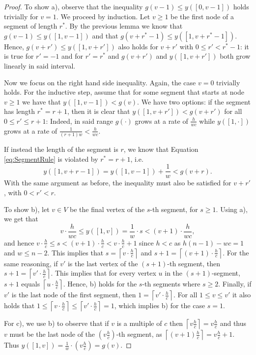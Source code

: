 \documentclass[11pt]{article}
\newcommand\+{\mkern2mu}
\newcommand{\ceil}[1]{\left\lceil #1 \right\rceil}
\begin{document}
\begin{proof}
     To show a), observe that the inequality $g(v-1) \leq y([0, v-1])$ holds trivially for $v=1$. We proceed by induction. Let $v \geq 1$ be the first node of a segment of length $r^*$. By the previous lemma we know that $g(v-1)\le y([1,v-1])$ and that $g(v+r^*-1)\le y([1,v+r^*-1])$. Hence,  $g(v+r') \leq y([1, v+r'])$ also holds for $v+r'$ with $0 \le r' < r^*-1$: it is true for $r'=-1$ and for $r'=r^*$ and $g(v+r')$ and $y([1, v+r'])$ both grow linearly in said interval. 
    
    Now we focus on the right hand side inequality. Again, the case $v=0$ trivially holds. For the inductive step, assume that for some segment that starts at node $v \geq 1$ we have that $y([1, v-1]) < g(v)$. We have two options: if the segment has length $r^*=r+1$, then it is clear that $y([1, v+r']) < g(v + r')$ for all $0\le r' \leq r+1$: Indeed, in said range $g(\cdot)$ grows at a rate of $\frac{h}{wc}$ while $y([1,\cdot])$ grows at a rate of $\frac{1}{(r+1)w} < \frac{h}{wc}$. 
    
    If instead the length of the segment is $r$, we know that Equation \eqref{eq:SegmentRule} is violated by $r^*=r+1$, i.e. 
    $$
        y([1, v+r-1]) = y([1, v-1]) + \frac{1}{w} < g(v+r).
    $$
    With the same argument as before, the inequality must also be satisfied for $v + r'$, with $0 < r' < r$.

    To show b), let $v \in V$ be the final vertex of the $s$-th segment, for $s\ge 1$. Using a), we get that
    $$
    v\cdot \frac{h}{wc} \leq y([1, v]) = \frac{1}{w}\cdot s < (v+1) \cdot \frac{h}{wc},
    $$
    and hence $v\cdot \frac{h}{c} \leq s < (v+1) \cdot \frac{h}{c} < v\cdot \frac{h}{c} +1 $ since $h< c$ as $h(n-1)-wc=1$ and $w\le n-2$. This implies that $s=\ceil{v\cdot \frac{h}{c}}$ and $s+1=\ceil{(v+1)\cdot \frac{h}{c}}$. For the same reasoning, if $v'$ is the last vertex of the $(s+1)$-th segment, then $s+1=\ceil{v'\cdot \frac{h}{c}}$. This implies that for every vertex $u$ in the $(s+1)$-segment, $s+1$ equals $\ceil{u\cdot \frac{h}{c}}$. Hence, b) holds for the $s$-th segments where $s\ge 2$. Finally, if $v'$ is the last node of the first segment, then $1=\ceil{v'\cdot \frac{h}{c}}$. For all $1\le v\le v'$ it also holds that $1\le \ceil{v\cdot \frac{h}{c}}\le \ceil{v'\cdot \frac{h}{c}}=1$, which implies b) for the case $s=1$. 



    For c), we use b) to observe that if $v$ is a multiple of $c$ then $\ceil{v\frac{h}{c}}= v\frac{h}{c}$ and thus $v$ must be the last node of the $(v\frac{h}{c})$-th segment, as $\ceil{(v+1)\frac{h}{c}} = v\frac{h}{c} +1$. Thus $y([1,v])= \frac{1}{w}\cdot(v\frac{h}{c})= g(v).$ 
    

\end{proof}
\end{document}
